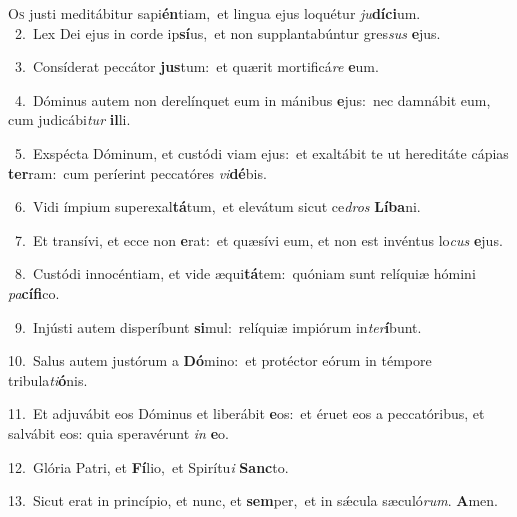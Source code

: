 \lettrine{\initial\textcolor{\initialcolor}{O}}{s} justi meditábitur sapi\-\textbf{én}\-tiam,~\star et lingua ejus loquétur \textit{ju}\-\textbf{dí}\textbf{ci}um.\\
{\numbfont\textcolor{\numbcolor}{~2.}}~Lex Dei ejus in corde ip\-\textbf{sí}\-us,~\star et non supplantabúntur gres\textit{sus} \textbf{e}\-jus.\par
{\numbfont\textcolor{\numbcolor}{~3.}}~Consíderat peccátor \textbf{jus}\-tum:~\star et quærit mortificá\textit{re} \textbf{e}\-um.\par
{\numbfont\textcolor{\numbcolor}{~4.}}~Dóminus autem non derelínquet eum in mánibus \textbf{e}\-jus:~\star nec damnábit eum, cum judicábi\textit{tur} \textbf{il}\-li.\par
{\numbfont\textcolor{\numbcolor}{~5.}}~Exspécta Dóminum, et custódi viam ejus:~\dagger et exaltábit te ut hereditáte cápias \textbf{ter}\-ram:~\star cum períerint peccatóres \textit{vi}\-\textbf{dé}bis.\par
{\numbfont\textcolor{\numbcolor}{~6.}}~Vidi ímpium superexal\-\textbf{tá}\-tum,~\star et elevátum sicut ce\textit{dros} \textbf{Lí}\-\textbf{ba}ni.\par
{\numbfont\textcolor{\numbcolor}{~7.}}~Et transívi, et ecce non \textbf{e}\-rat:~\star et quæsívi eum, et non est invéntus lo\textit{cus} \textbf{e}\-jus.\par
{\numbfont\textcolor{\numbcolor}{~8.}}~Custódi innocéntiam, et vide æqui\-\textbf{tá}\-tem:~\star quóniam sunt relíquiæ hómini \textit{pa}\-\textbf{cí}\textbf{fi}co.\par
{\numbfont\textcolor{\numbcolor}{~9.}}~Injústi autem disperíbunt \textbf{si}\-mul:~\star relíquiæ impiórum in\-\textit{ter}\-\textbf{í}bunt.\par
{\numbfont\textcolor{\numbcolor}{10.}}~Salus autem justórum a \textbf{Dó}\-mino:~\star et protéctor eórum in témpore tribula\-\textit{ti}\-\textbf{ó}nis.\par
{\numbfont\textcolor{\numbcolor}{11.}}~Et adjuvábit eos Dóminus et liberábit \textbf{e}\-os:~\star et éruet eos a peccatóribus, et salvábit eos: quia speravérunt \textit{in} \textbf{e}\-o.\par
{\numbfont\textcolor{\numbcolor}{12.}}~Glória Patri, et \textbf{Fí}\-lio,~\star et Spirítu\textit{i} \textbf{Sanc}\-to.\par
{\numbfont\textcolor{\numbcolor}{13.}}~Sicut erat in princípio, et nunc, et \textbf{sem}\-per,~\star et in sǽcula sæculó\-\textit{rum}\-. \textbf{A}\-men.\par
